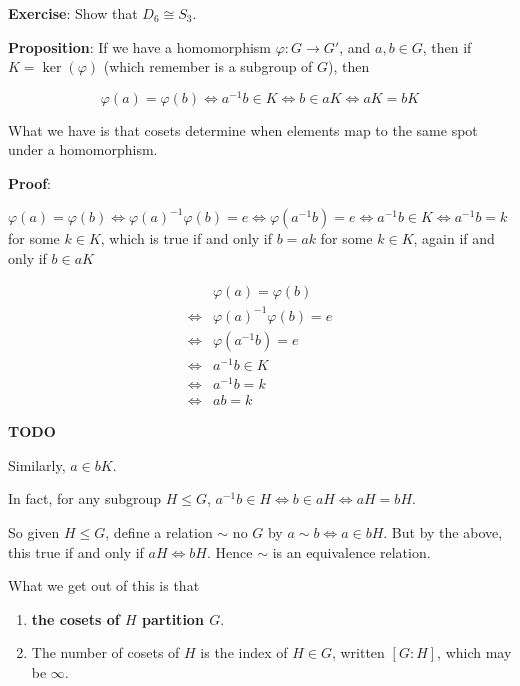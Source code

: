 \documentclass[12pt]{article}
\def\phi{\varphi}
\newcommand{\TODO}{\color{red}\textbf{TODO}\color{black}}
\begin{document}
{\bf Exercise}: Show that $D_6 \cong S_3$.


{\bf Proposition}: If we have a homomorphism $\phi: G \to G'$, and $a, b \in G$,
then if $K = \ker(\phi)$ (which remember is a subgroup of $G$), then

\[
  \phi(a) = \phi(b) \Leftrightarrow a^{-1}b \in K \Leftrightarrow b \in a K
  \Leftrightarrow a K = b K
\]

What we have is that cosets determine when elements map to the same spot under a
homomorphism.

{\bf Proof}:

$\phi(a) = \phi(b) \Leftrightarrow \phi(a)^{-1}\phi(b) = e \Leftrightarrow
\phi(a^{-1}b) = e \Leftrightarrow a^{-1}b \in K \Leftrightarrow a^{-1}b = k$ for
some $k \in K$, which is true if and only if $b = ak$ for some $k \in K$, again
if and only if $b \in a K$

\begin{align*}
  &\phi(a) = \phi(b) \\
  \Leftrightarrow &\phi(a)^{-1}\phi(b) = e \\
  \Leftrightarrow &\phi(a^{-1}b) = e \\
  \Leftrightarrow &a^{-1}b \in K \\
  \Leftrightarrow &a^{-1}b = k \\
  \Leftrightarrow &ab = k
\end{align*}

\TODO {}

Similarly, $a \in bK$.


In fact, for any subgroup $H \le G$, $a^{-1}b \in H \Leftrightarrow b \in aH
\Leftrightarrow aH = bH$.

So given $H \le G$, define a relation $\sim$ no $G$ by $a \sim b \Leftrightarrow
a \in bH$. But by the above, this true if and only if $aH \Leftrightarrow bH$.
Hence $\sim$ is an equivalence relation.

What we get out of this is that

\begin{enumerate}
  \item {\bf the cosets of $H$ partition $G$}.
  \item The number of cosets of $H$ is the index of $H \in G$, written $[G : H]$, which may be $\infty$.
\end{enumerate}
\end{document}
